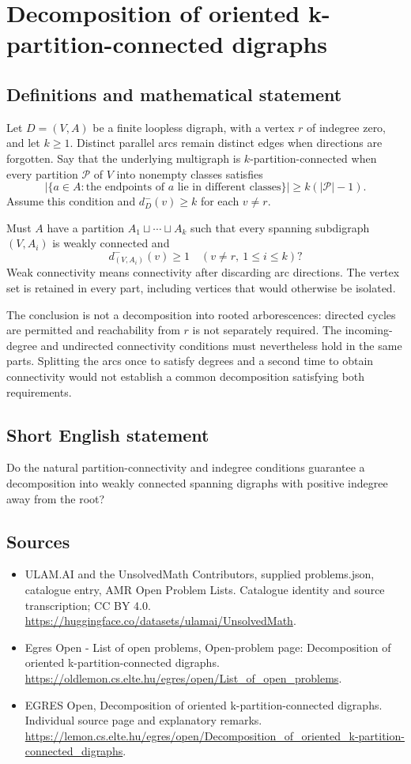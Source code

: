 \documentclass[11pt,a4paper]{article}
\begin{document}
\section*{Decomposition of oriented k-partition-connected digraphs}\label{statement}

\subsection{Definitions and mathematical statement}
Let $D=(V,A)$ be a finite loopless digraph, with a vertex $r$ of
indegree zero, and let $k\ge1$. Distinct parallel arcs remain distinct
edges when directions are forgotten. Say that the underlying multigraph
is $k$-partition-connected when every partition $\mathcal P$ of $V$
into nonempty classes satisfies
\[
  |\{a\in A:\text{the endpoints of }a\text{ lie in different classes}\}|
                                       \ge k(|\mathcal P|-1).
\]
Assume this condition and $d_D^-(v)\ge k$ for each $v\ne r$.

Must $A$ have a partition $A_1\sqcup\cdots\sqcup A_k$ such that every
spanning subdigraph $(V,A_i)$ is weakly connected and
\[
                           d^-_{(V,A_i)}(v)\ge1
                                  \quad(v\ne r,\ 1\le i\le k)?
\]
Weak connectivity means connectivity after discarding arc directions.
The vertex set is retained in every part, including vertices that would
otherwise be isolated.

The conclusion is not a decomposition into rooted arborescences:
directed cycles are permitted and reachability from $r$ is not separately
required. The incoming-degree and undirected connectivity conditions
must nevertheless hold in the same parts. Splitting the arcs once to
satisfy degrees and a second time to obtain connectivity would not
establish a common decomposition satisfying both requirements.
\subsection{Short English statement}
Do the natural partition-connectivity and indegree conditions
guarantee a decomposition into weakly connected spanning digraphs with positive indegree away from the root?
\subsection{Sources}
\begin{itemize}
\item[S1] ULAM.AI and the UnsolvedMath Contributors, supplied problems.json, catalogue entry, AMR Open Problem Lists. Catalogue identity and source transcription; CC BY 4.0.
\url{https://huggingface.co/datasets/ulamai/UnsolvedMath}.
\item[S2] Egres Open - List of open problems, Open-problem page: Decomposition of oriented k-partition-connected digraphs. 
\url{https://oldlemon.cs.elte.hu/egres/open/List_of_open_problems}.
\item[S3] EGRES Open, Decomposition of oriented k-partition-connected digraphs. Individual source page and explanatory remarks.
\url{https://lemon.cs.elte.hu/egres/open/Decomposition_of_oriented_k-partition-connected_digraphs}.
\end{itemize}
\end{document}
